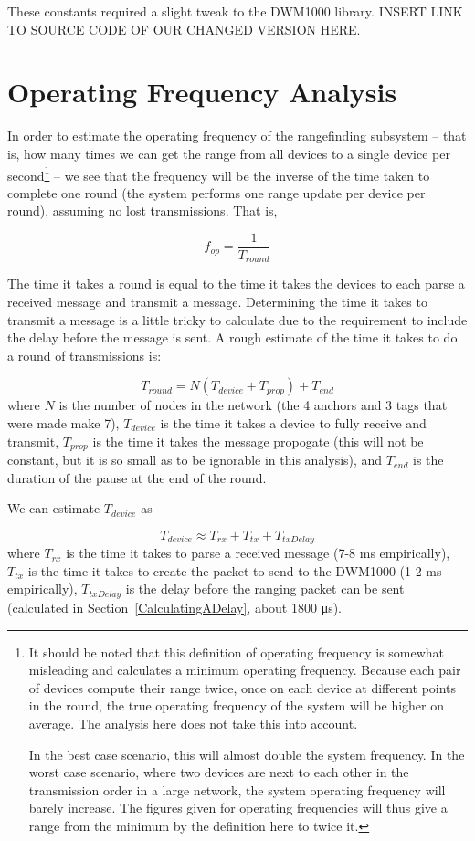 These constants required a slight tweak to the DWM1000 library. INSERT LINK TO SOURCE CODE OF OUR CHANGED VERSION HERE.

\section{Operating Frequency Analysis}
\label{OperatingFrequencyAnalysis}
In order to estimate the operating frequency of the rangefinding subsystem -- that is, how many times we can get the range from all devices to a single device per second\footnote{It should be noted that this definition of operating frequency is somewhat misleading and calculates a minimum operating frequency. Because each pair of devices compute their range twice, once on each device at different points in the round, the true operating frequency of the system will be higher on average. The analysis here does not take this into account. 

In the best case scenario, this will almost double the system frequency. In the worst case scenario, where two devices are next to each other in the transmission order in a large network, the system operating frequency will barely increase. The figures given for operating frequencies will thus give a range from the minimum by the definition here to twice it.} -- we see that the frequency will be the inverse of the time taken to complete one round (the system performs one range update per device per round), assuming no lost transmissions. That is,

\[
 	f_{op} = \frac{1}{T_{round}}
\]

The time it takes a round is equal to the time it takes the devices to each parse a received message and transmit a message. Determining the time it takes to transmit a message is a little tricky to calculate due to the requirement to include the delay before the message is sent. A rough estimate of the time it takes to do a round of transmissions is:

\[
	T_{round} =  N(T_{device} + T_{prop}) + T_{end}
\]
where $N$ is the number of nodes in the network (the 4 anchors and 3 tags that were made make 7), $T_{device}$ is the time it takes a device to fully receive and transmit, $T_{prop}$ is the time it takes the message propogate (this will not be constant, but it is so small as to be ignorable in this analysis), and $T_{end}$ is the duration of the pause at the end of the round. 

We can estimate $T_{device}$ as

\[
	T_{device} \approx T_{rx} + T_{tx} + T_{txDelay}
\]
where $T_{rx}$ is the time it takes to parse a received message (7-8 ms empirically), $T_{tx}$ is the time it takes to create the packet to send to the DWM1000 (1-2 ms empirically), $T_{txDelay}$ is the delay before the ranging packet can be sent (calculated in Section~\ref{CalculatingADelay}, about 1800 \si{\micro\second}).

